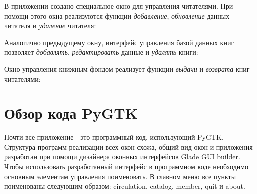 \documentclass[14pt,a4paper,openany,twoside,final]{extbook}
\begin{document}
В приложении создано специальное окно для управления читателями.  При
помощи этого окна реализуются функции \emph{добавление}, \emph{обновление}
данных читателя и \emph{удаление} читателя:

\noindent{}

Аналогично предыдущему окну, интерфейс управления базой данных книг
позволяет \emph{добавлять}, \emph{редактировать} данные и \emph{удалять} книги:

\noindent{}

Окно управления книжным фондом реализует функции \emph{выдачи} и \emph{возврата}
книг читателями:

\noindent{}


\section{Обзор кода PyGTK%
  \label{pygtk}%
}

Почти все приложение - это программный код, использующий PyGTK.
Структура программ реализации всех окон схожа, общий вид окон и
приложения разработан при помощи дизайнера оконных интерфейсов Glade
GUI builder.  Чтобы использовать разработанный интерфейс в программном
коде необходимо основным элементам управления поименовать.  В главном
меню все пункты поименованы следующим образом: \textquotedbl{}circulation\textquotedbl{},
\textquotedbl{}catalog\textquotedbl{}, \textquotedbl{}member\textquotedbl{}, \textquotedbl{}quit\textquotedbl{} и \textquotedbl{}about\textquotedbl{}.
\end{document}
